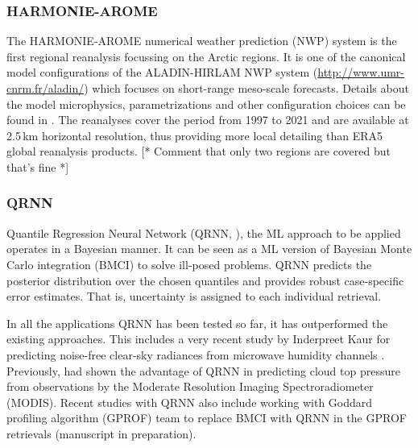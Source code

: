 \documentclass[12pt,oneside,a4paper]{article}
\newcommand\intodo[1]{{\color{red} [* #1 *]}}
\begin{document}
\subsubsection{HARMONIE-AROME}
%
\label{sec:harmonie}
The HARMONIE-AROME numerical weather prediction (NWP) system is the first
regional reanalysis focussing on the Arctic regions. It is one of the canonical model configurations of the ALADIN-HIRLAM
NWP system (\url{http://www.umr-cnrm.fr/aladin/}) which focuses on short-range
meso-scale forecasts. Details about the model microphysics, parametrizations
and other configuration choices can be found in \citet{bengtsson:2017:harmo}.
The reanalyses cover the period from 1997 to 2021 and are available at 2.5\,km
horizontal resolution, thus providing more local detailing than ERA5 global
reanalysis products. \intodo{Comment that only two regions are covered but
  that's fine}
 
\subsubsection{QRNN}
%
\label{sec:qrnn}

Quantile Regression Neural Network (QRNN, \citet{pfreundschuh:aneur:18}), the
ML approach to be applied operates in a Bayesian manner. It can be seen as a ML
version of Bayesian Monte Carlo integration (BMCI) to solve ill-posed problems.
QRNN predicts the posterior distribution over the chosen quantiles and provides
robust case-specific error estimates. That is, uncertainty is assigned to each
individual retrieval. 


In all the applications QRNN has been tested so far, it has outperformed the
existing approaches. This includes a very recent study by Inderpreet Kaur for
predicting noise-free clear-sky radiances from microwave humidity channels
\citep{kaur:2021:canma}. Previously, \citet{pfreundschuh:aneur:18} had shown
the advantage of QRNN in predicting cloud top pressure from observations by the
Moderate Resolution Imaging Spectroradiometer (MODIS). Recent studies with QRNN
also include working with Goddard profiling algorithm (GPROF) team to replace
BMCI with QRNN in the GPROF retrievals (manuscript in
preparation).
\end{document}
